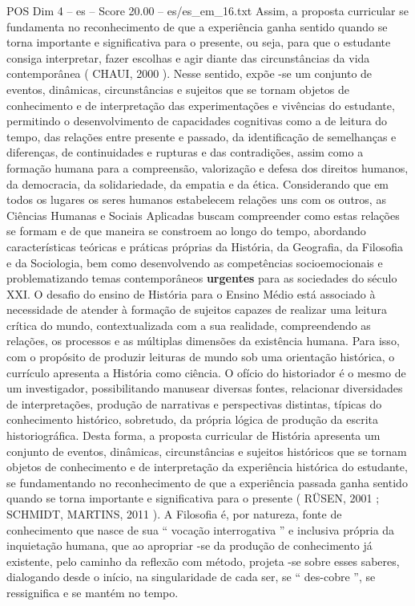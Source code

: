 \begin{textsample}{POS Dim 4 – es – Score 20.00 – es/es\_em\_16.txt}
Assim, a proposta curricular se fundamenta no reconhecimento de que a experiência ganha sentido quando se torna importante e significativa para o presente, ou seja, para que o estudante consiga interpretar, fazer escolhas e agir diante das circunstâncias da vida contemporânea ( CHAUI, 2000 ).
Nesse sentido, expõe -se um conjunto de eventos, dinâmicas, circunstâncias e sujeitos que se tornam objetos de conhecimento e de interpretação das experimentações e vivências do estudante, permitindo o desenvolvimento de capacidades cognitivas como a de leitura do tempo, das relações entre presente e passado, da identificação de semelhanças e diferenças, de continuidades e rupturas e das contradições, assim como a formação humana para a compreensão, valorização e defesa dos direitos humanos, da democracia, da solidariedade, da empatia e da ética.
Considerando que em todos os lugares os seres humanos estabelecem relações uns com os outros, as Ciências Humanas e Sociais Aplicadas buscam compreender como estas relações se formam e de que maneira se constroem ao longo do tempo, abordando características teóricas e práticas próprias da História, da Geografia, da Filosofia e da Sociologia, bem como desenvolvendo as competências socioemocionais e problematizando temas contemporâneos \textbf{urgentes} para as sociedades do século XXI.
O desafio do ensino de História para o Ensino Médio está associado à necessidade de atender à formação de sujeitos capazes de realizar uma leitura crítica do mundo, contextualizada com a sua realidade, compreendendo as relações, os processos e as múltiplas dimensões da existência humana.
Para isso, com o propósito de produzir leituras de mundo sob uma orientação histórica, o currículo apresenta a História como ciência.
O ofício do historiador é o mesmo de um investigador, possibilitando manusear diversas fontes, relacionar diversidades de interpretações, produção de narrativas e perspectivas distintas, típicas do conhecimento histórico, sobretudo, da própria lógica de produção da escrita historiográfica.
Desta forma, a proposta curricular de História apresenta um conjunto de eventos, dinâmicas, circunstâncias e sujeitos históricos que se tornam objetos de conhecimento e de interpretação da experiência histórica do estudante, se fundamentando no reconhecimento de que a experiência passada ganha sentido quando se torna importante e significativa para o presente ( RÜSEN, 2001 ; SCHMIDT, MARTINS, 2011 ).
A Filosofia é, por natureza, fonte de conhecimento que nasce de sua “ vocação interrogativa ” e inclusiva própria da inquietação humana, que ao apropriar -se da produção de conhecimento já existente, pelo caminho da reflexão com método, projeta -se sobre esses saberes, dialogando desde o início, na singularidade de cada ser, se “ des-cobre ”, se ressignifica e se mantém no tempo.

\end{textsample}
